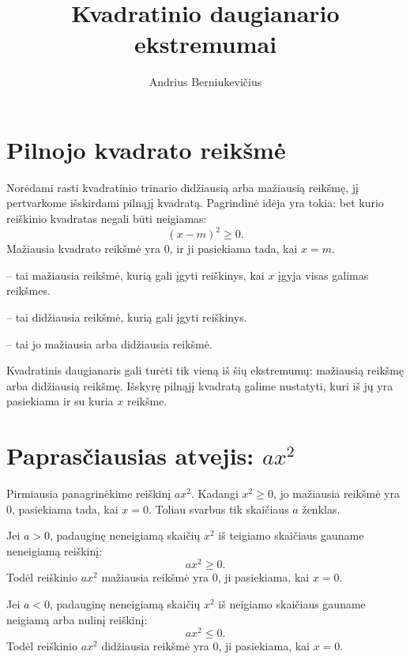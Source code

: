 \documentclass[11pt,a4paper]{scrartcl}
\title{Kvadratinio daugianario ekstremumai}
\author{Andrius Berniukevičius}
\begin{document}
\maketitle

\section{Pilnojo kvadrato reikšmė}

Norėdami rasti kvadratinio trinario didžiausią arba mažiausią reikšmę, jį pertvarkome išskirdami pilnąjį kvadratą. Pagrindinė idėja yra tokia: bet kurio reiškinio kvadratas negali būti neigiamas:
\[
(x-m)^2\geq0.
\]
Mažiausia kvadrato reikšmė yra $0$, ir ji pasiekiama tada, kai $x=m$.

\begin{definition}
 -- tai mažiausia reikšmė, kurią gali įgyti reiškinys, kai $x$ įgyja visas galimas reikšmes.
\end{definition}

\begin{definition}
 -- tai didžiausia reikšmė, kurią gali įgyti reiškinys.
\end{definition}

\begin{definition}
 -- tai jo mažiausia arba didžiausia reikšmė.
\end{definition}

Kvadratinis daugianaris gali turėti tik vieną iš šių ekstremumų: mažiausią reikšmę arba didžiausią reikšmę. Išskyrę pilnąjį kvadratą galime nustatyti, kuri iš jų yra pasiekiama ir su kuria $x$ reikšme.

\section{Paprasčiausias atvejis: \texorpdfstring{$ax^2$}{ax2}}

Pirmiausia panagrinėkime reiškinį $ax^2$. Kadangi $x^2\geq0$, jo mažiausia reikšmė yra $0$, pasiekiama tada, kai $x=0$. Toliau svarbus tik skaičiaus $a$ ženklas.

Jei $a>0$, padauginę neneigiamą skaičių $x^2$ iš teigiamo skaičiaus gauname neneigiamą reiškinį:
\[
ax^2\geq0.
\]
Todėl reiškinio $ax^2$ mažiausia reikšmė yra $0$, ji pasiekiama, kai $x=0$.

Jei $a<0$, padauginę neneigiamą skaičių $x^2$ iš neigiamo skaičiaus gauname neigiamą arba nulinį reiškinį:
\[
ax^2\leq0.
\]
Todėl reiškinio $ax^2$ didžiausia reikšmė yra $0$, ji pasiekiama, kai $x=0$.
\end{document}
